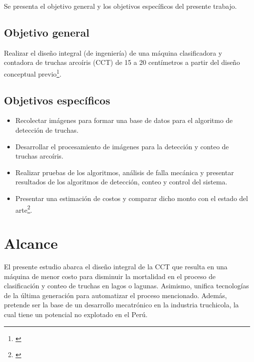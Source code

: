 Se presenta el objetivo general y los objetivos específicos del presente trabajo.

\subsection{Objetivo general}

Realizar el diseño integral (de ingeniería) de una máquina clasificadora y contadora de truchas arcoíris (CCT) de 15 a 20 centímetros a partir del diseño conceptual previo\footnote{\cite{DiazVergara2020}}.

\subsection{Objetivos específicos}

\begin{itemize}
	\item Recolectar imágenes para formar una base de datos para el algoritmo de detección de truchas. 
	\item Desarrollar el procesamiento de imágenes para la detección y conteo de truchas arcoíris.
	\item Realizar pruebas de los algoritmos, análisis de falla mecánica y presentar resultados de los algoritmos de detección, conteo y control del sistema.
	\item Presentar una estimación de costos y comparar dicho monto con el estado del arte\footnote{\cite{DiazVergara2020}}.	
\end{itemize}


\section{Alcance}

El presente estudio abarca el diseño integral de la CCT que resulta en una máquina de menor costo para disminuir la mortalidad en el proceso de clasificación y conteo de truchas en lagos o lagunas. Asimismo, unifica tecnologías de la última generación para automatizar el proceso mencionado. Además, pretende ser la base de un desarrollo mecatrónico en la industria truchicola, la cual tiene un potencial no explotado en el Perú.











